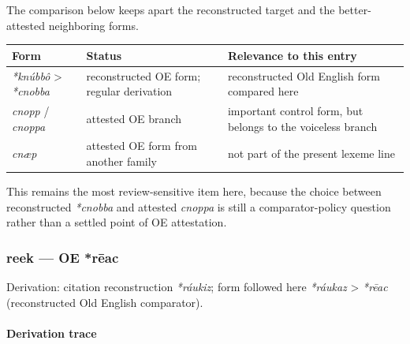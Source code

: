 \documentclass[
  british,
  a4paper,
]{article}
\newcounter{none} %
\begin{document}
The comparison below keeps apart the reconstructed target and the
better-attested neighboring forms.

{\def\LTcaptype{none} %
\begin{longtable}[]{@{}
  >{\raggedright\arraybackslash}p{}
  >{\raggedright\arraybackslash}p{}
  >{\raggedright\arraybackslash}p{}@{}}
\toprule\noalign{}
\begin{minipage}[b]{\linewidth}\raggedright
Form
\end{minipage} & \begin{minipage}[b]{\linewidth}\raggedright
Status
\end{minipage} & \begin{minipage}[b]{\linewidth}\raggedright
Relevance to this entry
\end{minipage} \\
\midrule\noalign{}
\endhead
\bottomrule\noalign{}
\endlastfoot
\emph{*knúbbô} \textgreater{} \emph{*cnobba} & reconstructed OE form;
regular derivation & reconstructed Old English form compared here \\
\emph{cnopp} / \emph{cnoppa} & attested OE branch & important control
form, but belongs to the voiceless branch \\
\emph{cnæp} & attested OE form from another family & not part of the
present lexeme line \\
\end{longtable}
}

This remains the most review-sensitive item here, because the choice
between reconstructed \emph{*cnobba} and attested \emph{cnoppa} is still
a comparator-policy question rather than a settled point of OE
attestation.

\subsubsection{reek --- OE *rēac}\label{reek-oe-rux113ac}

Derivation: citation reconstruction \emph{*ráukiz}; form followed here
\emph{*ráukaz} \textgreater{} \emph{*rēac} (reconstructed Old English
comparator).

\paragraph{Derivation trace}\label{derivation-trace-68}
\end{document}
